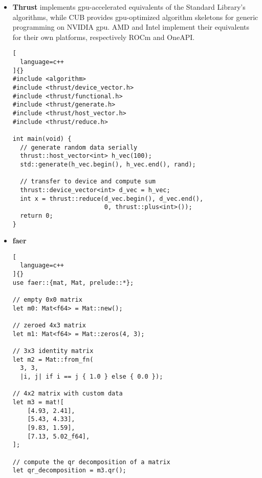 \documentclass[../main]{subfiles}
\begin{document}
\begin{itemize}
\begin{lstlisting}[
  language=c++
]{}
  hpx::future<std::uint64_t> n1 =
      hpx::async(fibonacci, n - 1);
  hpx::future<std::uint64_t> n2 =
      hpx::async(fibonacci, n - 2);

  // wait for the futures to return their values
  return n1.get() + n2.get();
}
\end{lstlisting}

\item
\textbf{Thrust} \cite{thrust} implements \acrshort{gpu}-accelerated equivalents
of the Standard Library's algorithms, while CUB \cite{cub} provides
\acrshort{gpu}-optimized algorithm skeletons for generic programming on NVIDIA \gls{gpu}\acrpluralsuffix{}.
AMD and Intel implement their equivalents for their own platforms, respectively
ROCm and OneAPI.

\begin{lstlisting}[
  language=c++
]{}
#include <algorithm>
#include <thrust/device_vector.h>
#include <thrust/functional.h>
#include <thrust/generate.h>
#include <thrust/host_vector.h>
#include <thrust/reduce.h>

int main(void) {
  // generate random data serially
  thrust::host_vector<int> h_vec(100);
  std::generate(h_vec.begin(), h_vec.end(), rand);

  // transfer to device and compute sum
  thrust::device_vector<int> d_vec = h_vec;
  int x = thrust::reduce(d_vec.begin(), d_vec.end(),
                         0, thrust::plus<int>());
  return 0;
}
\end{lstlisting}

\item
\textbf{faer} \cite{faer}

\begin{lstlisting}[
  language=c++
]{}
use faer::{mat, Mat, prelude::*};

// empty 0x0 matrix
let m0: Mat<f64> = Mat::new();

// zeroed 4x3 matrix
let m1: Mat<f64> = Mat::zeros(4, 3);

// 3x3 identity matrix
let m2 = Mat::from_fn(
  3, 3,
  |i, j| if i == j { 1.0 } else { 0.0 });

// 4x2 matrix with custom data
let m3 = mat![
    [4.93, 2.41],
    [5.43, 4.33],
    [9.83, 1.59],
    [7.13, 5.02_f64],
];

// compute the qr decomposition of a matrix
let qr_decomposition = m3.qr();
\end{lstlisting}

\end{itemize}
\end{document}
